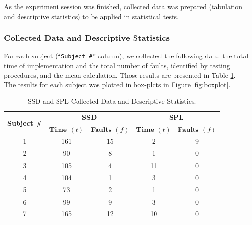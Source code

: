 As the experiment session was finished, collected data was prepared (tabulation and descriptive statistics) to be applied in statistical tests.

\subsubsection{Collected Data and Descriptive Statistics}

For each subject (``\texttt{Subject \#}'' column), we collected the following data: the total time of implementation and the total number of faults, identified by testing procedures, and the mean calculation. Those results are presented in Table \ref{tab:resul1}. The results for each subject was plotted in box-plots in Figure \ref{fig:boxplot}. 


\begin{table}[!ht]
\caption{\label{tab:resul1}SSD and SPL Collected Data and Descriptive Statistics.}
    \centering
    \scriptsize
\begin{tabular}{c|c|c|c|c}
\hline
\multirow{2}{*}{\textbf{Subject \#}} & \multicolumn{2}{c|}{\textbf{SSD}} & \multicolumn{2}{c}{\textbf{SPL}}  \\ \cline{2-5}
                                    & \textbf{Time $(t)$}   & \textbf{Faults $(f)$} & \textbf{Time $(t)$}  & \textbf{Faults $(f)$}                                  \\ \hline
1                                   & 161             & 15              & 2              & 9                                              \\ \hline
2                                   & 90              & 8               & 1              & 0                                             \\ \hline
3                                   & 105             & 4               & 11             & 0                                              \\ \hline
4                                   & 104             & 1               & 3              & 0                                             \\ \hline
5                                   & 73              & 2               & 1              & 0                                             \\ \hline
6                                   & 99              & 9               & 3              & 0                                              \\ \hline
7                                   & 165             & 12              & 10             & 0                                              \\ \hline

\end{tabular}
\end{table}
